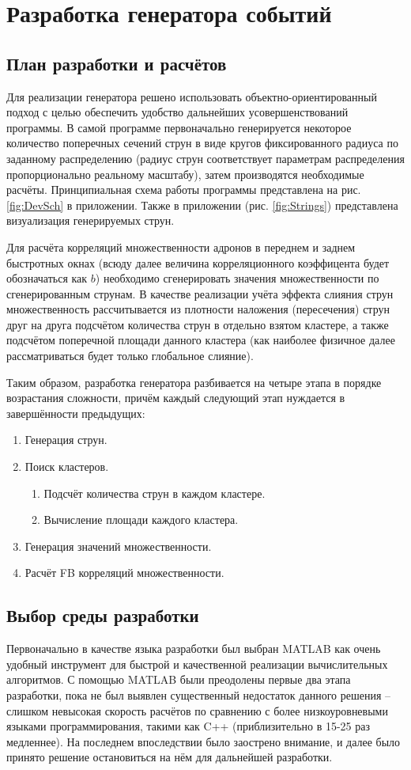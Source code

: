 \section{Разработка генератора событий}
\subsection{План разработки и расчётов}
Для реализации генератора решено использовать объектно-ориентированный подход с целью обеспечить удобство дальнейших усовершенствований программы. В самой программе первоначально генерируется некоторое количество поперечных сечений струн в виде кругов фиксированного радиуса по заданному распределению (радиус струн соответствует параметрам распределения пропорционально реальному масштабу), затем производятся необходимые расчёты. Принципиальная схема работы программы представлена на рис. \ref{fig:DevSch} в приложении. Также в приложении (рис. \ref{fig:Strings}) представлена визуализация генерируемых струн. 

Для расчёта корреляций множественности адронов в переднем и заднем быстротных окнах (всюду далее величина корреляционного коэффицента будет обозначаться как $b$) необходимо сгенерировать значения множественности по сгенерированным струнам. В качестве реализации учёта эффекта слияния струн множественность рассчитывается из плотности наложения (пересечения) струн друг на друга подсчётом количества струн в отдельно взятом кластере, а также подсчётом поперечной площади данного кластера (как наиболее физичное далее рассматриваться будет только глобальное слияние). 

Таким образом, разработка генератора разбивается на четыре этапа в порядке возрастания сложности, причём каждый следующий этап нуждается в завершённости предыдущих:
\begin{enumerate}[label=\arabic*.]
\item	Генерация струн.
\item	Поиск кластеров.
	\begin{enumerate}
	\item	Подсчёт количества струн в каждом кластере.
	\item	Вычисление площади каждого кластера.
	\end{enumerate}
\item	Генерация значений множественности.
\item	Расчёт FB корреляций множественности.
\end{enumerate}
\subsection{Выбор среды разработки}
Первоначально в качестве языка разработки был выбран MATLAB как очень удобный инструмент для быстрой и качественной реализации вычислительных алгоритмов. С помощью MATLAB были преодолены первые два этапа разработки, пока не был выявлен существенный недостаток данного решения -- слишком невысокая скорость расчётов по сравнению с более низкоуровневыми языками программирования, такими как C++ (приблизительно в 15-25 раз медленнее). На последнем впоследствии было заострено внимание, и далее было принято решение остановиться на нём для дальнейшей разработки. 

